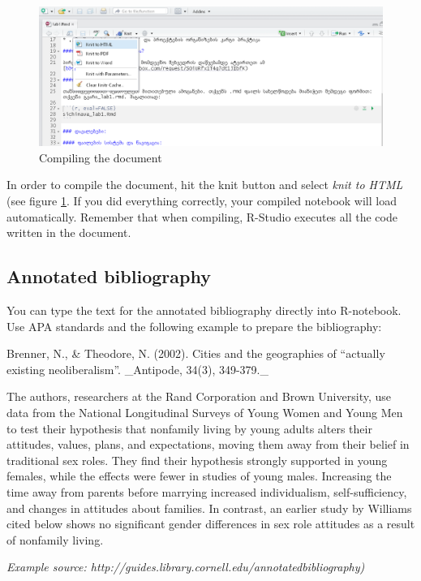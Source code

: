 \documentclass{article}\usepackage[]{graphicx}\usepackage[]{color}
\begin{document}
\begin{figure}[h]
\centering
\includegraphics[width=\textwidth]{img/knit_to_html.PNG}
\caption{Compiling the document}
    \label{compile}
\end{figure}

In order to compile the document, hit the knit button and select \emph{knit to HTML} (see figure \ref{compile}. If you did everything correctly, your compiled notebook will load automatically. Remember that when compiling, R-Studio executes all the code written in the document.

\subsection*{Annotated bibliography}

You can type the text for the annotated bibliography directly into R-notebook. Use APA standards and the following example to prepare the bibliography:

Brenner, N., & Theodore, N. (2002). Cities and the geographies of “actually existing neoliberalism”. _Antipode, 34(3), 349-379._


The authors, researchers at the Rand Corporation and Brown University, use data from the National Longitudinal Surveys of Young Women and Young Men to test their hypothesis that nonfamily living by young adults alters their attitudes, values, plans, and expectations, moving them away from their belief in traditional sex roles. They find their hypothesis strongly supported in young females, while the effects were fewer in studies of young males. Increasing the time away from parents before marrying increased individualism, self-sufficiency, and changes in attitudes about families. In contrast, an earlier study by Williams cited below shows no significant gender differences in sex role attitudes as a result of nonfamily living.

\emph{Example source: http://guides.library.cornell.edu/annotatedbibliography)}
\end{document}

